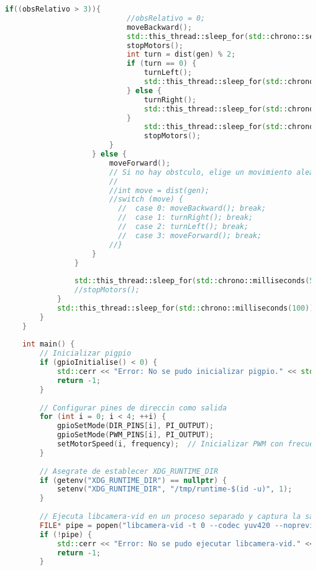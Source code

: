 \begin{lstlisting}[language={C++}, caption={Primer ajuste de c\'odigo}, label={Script}]
                        if((obsRelativo > 3)){
                            //obsRelativo = 0;
                            moveBackward();
                            std::this_thread::sleep_for(std::chrono::seconds(3));
                            stopMotors();
                            int turn = dist(gen) % 2;
                            if (turn == 0) {
                                turnLeft();
                                std::this_thread::sleep_for(std::chrono::seconds(5));
                            } else {
                                turnRight();
                                std::this_thread::sleep_for(std::chrono::seconds(5));
                            }
                                std::this_thread::sleep_for(std::chrono::seconds(2));
                                stopMotors();
                        }
                    } else {
                        moveForward();
                        // Si no hay obstculo, elige un movimiento aleatorio
                        //
                        //int move = dist(gen);
                        //switch (move) {
                          //  case 0: moveBackward(); break;
                          //  case 1: turnRight(); break;
                          //  case 2: turnLeft(); break;
                          //  case 3: moveForward(); break;
                        //}
                    }
                }
                
                std::this_thread::sleep_for(std::chrono::milliseconds(500));
                //stopMotors();
            }
            std::this_thread::sleep_for(std::chrono::milliseconds(100));
        }
    }
    
    int main() {
        // Inicializar pigpio
        if (gpioInitialise() < 0) {
            std::cerr << "Error: No se pudo inicializar pigpio." << std::endl;
            return -1;
        }
    
        // Configurar pines de direccin como salida
        for (int i = 0; i < 4; ++i) {
            gpioSetMode(DIR_PINS[i], PI_OUTPUT);
            gpioSetMode(PWM_PINS[i], PI_OUTPUT);
            setMotorSpeed(i, frequency);  // Inicializar PWM con frecuencia inicial
        }
    
        // Asegrate de establecer XDG_RUNTIME_DIR
        if (getenv("XDG_RUNTIME_DIR") == nullptr) {
            setenv("XDG_RUNTIME_DIR", "/tmp/runtime-$(id -u)", 1);
        }
    
        // Ejecuta libcamera-vid en un proceso separado y captura la salida en YUV, sin previsualizacn
        FILE* pipe = popen("libcamera-vid -t 0 --codec yuv420 --nopreview -o -", "r");
        if (!pipe) {
            std::cerr << "Error: No se pudo ejecutar libcamera-vid." << std::endl;
            return -1;
        }
    

\end{lstlisting}
